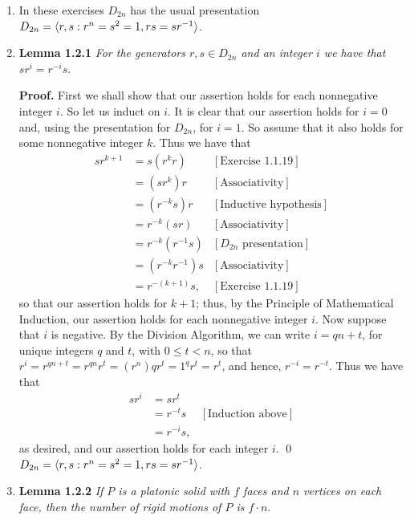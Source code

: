 \begin{enumerate}
   \item[]        In these exercises $D_{2n}$ has the usual presentation
                  $D_{2n} = \langle r, s : r^n = s^2 = 1, rs = sr^{-1} \rangle$.
   \item[]        \textbf{Lemma 1.2.1} \textit{For the generators
                  $r, s \in D_{2n}$ and an integer $i$ we have that
                  $sr^i = r^{-i}s$}.
                  
      \textbf{Proof.} First we shall show that our assertion holds for each
      nonnegative integer $i$. So let us induct on $i$. It is clear that our
      assertion holds for $i = 0$ and, using the presentation for $D_{2n}$, for
      $i = 1$. So assume that it also holds for some nonnegative integer $k$.
      Thus we have that
      \begin{align*}
         sr^{k + 1} &= s(r^kr) &[\text{Exercise 1.1.19}] \\
                    &= (sr^k)r &[\text{Associativity}] \\
                    &= (r^{-k}s)r &[\text{Inductive hypothesis}] \\
                    &= r^{-k}(sr) &[\text{Associativity}] \\
                    &= r^{-k}(r^{-1}s) &[D_{2n} \text{ presentation}] \\
                    &= (r^{-k}r^{-1})s &[\text{Associativity}] \\
                    &= r^{-(k+1)}s, &[\text{Exercise 1.1.19}]
      \end{align*}
      so that our assertion holds for $k + 1$; thus, by the Principle of 
      Mathematical Induction, our assertion holds for each nonnegative integer 
      $i$. Now suppose that $i$ is negative. By the Division Algorithm, we can 
      write $i = qn + t$, for unique integers $q$ and $t$, with $0 \le t < n$, 
      so that $r^i = r^{qn+t} = r^{qn}r^t = (r^n)qr^t = 1^qr^t = r^t$, and 
      hence, $r^{-i} = r^{-t}$. Thus we have that
      \begin{align*}
         sr^i &= sr^t \\
              &= r^{-t}s &[\text{Induction above}] \\
              &= r^{-i}s,
      \end{align*}
      as desired, and our assertion holds for each integer $i$. \qed
                  $D_{2n} = \langle r, s : r^n = s^2 = 1, rs = sr^{-1} \rangle$.
   \item[]        \textbf{Lemma 1.2.2} \textit{If $P$ is a platonic solid with
                  $f$ faces and $n$ vertices on each face, then the number of
                  rigid motions of $P$ is $f \cdot n$}.
                  

\end{enumerate}
